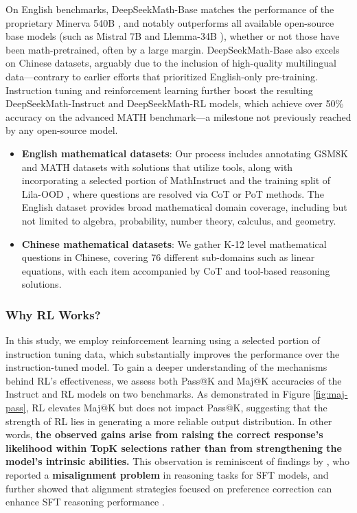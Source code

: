 \begin{itemize}[topsep=0pt]
    On English benchmarks, DeepSeekMath-Base matches the performance of the proprietary Minerva 540B \citep{minerva}, and notably outperforms all available open-source base models (such as Mistral 7B \citep{mistral} and Llemma-34B \citep{llemma}), whether or not those have been math-pretrained, often by a large margin. DeepSeekMath-Base also excels on Chinese datasets, arguably due to the inclusion of high-quality multilingual data—contrary to earlier efforts \citep{minerva,llemma} that prioritized English-only pre-training. Instruction tuning and reinforcement learning further boost the resulting DeepSeekMath-Instruct and DeepSeekMath-RL models, which achieve over 50\% accuracy on the advanced MATH benchmark—a milestone not previously reached by any open-source model. 
\end{itemize}

\begin{itemize}[topsep=0pt]
    \item \textbf{English mathematical datasets}: Our process includes annotating GSM8K and MATH datasets with solutions that utilize tools, along with incorporating a selected portion of MathInstruct \citep{MathInstruct} and the training split of Lila-OOD \citep{lila}, where questions are resolved via CoT or PoT methods. The English dataset provides broad mathematical domain coverage, including but not limited to algebra, probability, number theory, calculus, and geometry.
    \item \textbf{Chinese mathematical datasets}: We gather K-12 level mathematical questions in Chinese, covering 76 different sub-domains such as linear equations, with each item accompanied by CoT and tool-based reasoning solutions.
\end{itemize}

\subsubsection{Why RL Works?} In this study, we employ reinforcement learning using a selected portion of instruction tuning data, which substantially improves the performance over the instruction-tuned model. To gain a deeper understanding of the mechanisms behind RL's effectiveness, we assess both Pass@K and Maj@K accuracies of the Instruct and RL models on two benchmarks. As demonstrated in Figure \ref{fig:maj-pass}, RL elevates Maj@K but does not impact Pass@K, suggesting that the strength of RL lies in generating a more reliable output distribution. In other words, \textbf{the observed gains arise from raising the correct response’s likelihood within TopK selections rather than from strengthening the model’s intrinsic abilities.} This observation is reminiscent of findings by \citep{wang2023making}, who reported a \textbf{misalignment problem} in reasoning tasks for SFT models, and further showed that alignment strategies focused on preference correction can enhance SFT reasoning performance \citep{yuan2023rrhf,song2023preference,wang2023making}.


